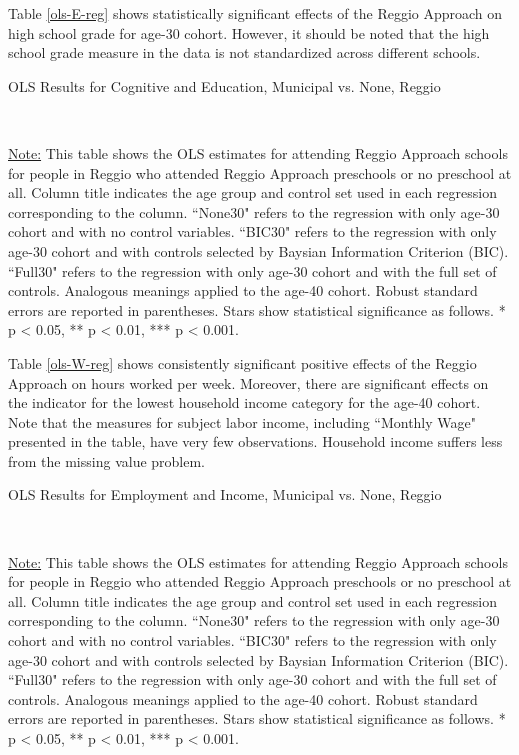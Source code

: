 Table \ref{ols-E-reg} shows statistically significant effects of the Reggio Approach on high school grade for age-30 cohort. However, it should be noted that the high school grade measure in the data is not standardized across different schools. 


\begin{table}[H] \caption{OLS Results for Cognitive and Education, Municipal vs. None, Reggio} \label{ols-E-reg}

\vspace{1ex} \\
\footnotesize\raggedright{\underline{Note:} This table shows the OLS estimates for attending Reggio Approach schools for people in Reggio who attended Reggio Approach preschools or no preschool at all. Column title indicates the age group and control set used in each regression corresponding to the column. ``None30" refers to the regression with only age-30 cohort and with no control variables. ``BIC30" refers to the regression with only age-30 cohort and with controls selected by Baysian Information Criterion (BIC). ``Full30" refers to the regression with only age-30 cohort and with the full set of controls. Analogous meanings applied to the age-40 cohort. Robust standard errors are reported in parentheses. Stars show statistical significance as follows. * p < 0.05, ** p < 0.01, *** p < 0.001.}
\end{table}

Table \ref{ols-W-reg} shows consistently significant positive effects of the Reggio Approach on hours worked per week. Moreover, there are significant effects on the indicator for the lowest household income category for the age-40 cohort. Note that the measures for subject labor income, including ``Monthly Wage" presented in the table, have very few observations. Household income suffers less from the missing value problem.

\begin{table}[H] \caption{OLS Results for Employment and Income, Municipal vs. None, Reggio} \label{ols-W-reg}
\scalebox{0.92}{
}
\vspace{1ex} \\
\footnotesize\raggedright{\underline{Note:} This table shows the OLS estimates for attending Reggio Approach schools for people in Reggio who attended Reggio Approach preschools or no preschool at all. Column title indicates the age group and control set used in each regression corresponding to the column. ``None30" refers to the regression with only age-30 cohort and with no control variables. ``BIC30" refers to the regression with only age-30 cohort and with controls selected by Baysian Information Criterion (BIC). ``Full30" refers to the regression with only age-30 cohort and with the full set of controls. Analogous meanings applied to the age-40 cohort. Robust standard errors are reported in parentheses. Stars show statistical significance as follows. * p < 0.05, ** p < 0.01, *** p < 0.001.}
\end{table}

